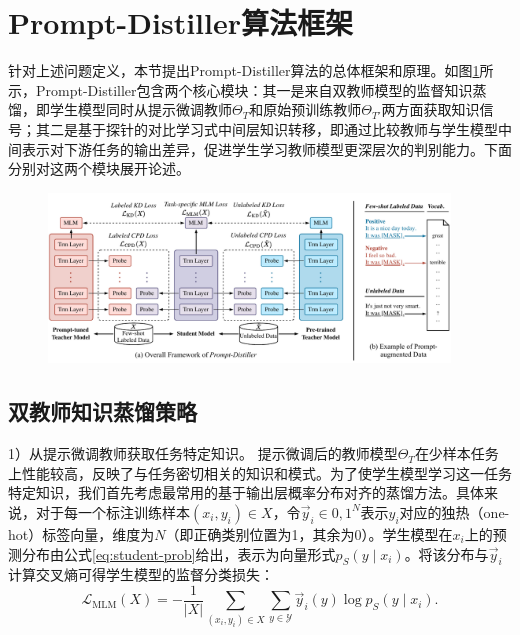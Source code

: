 \documentclass[../main.tex]{subfiles}
\begin{document}
\section{Prompt-Distiller算法框架}
\label{sec:3-3}
针对上述问题定义，本节提出Prompt-Distiller算法的总体框架和原理。如图\ref{fig:PromptDistillerFramework}所示，Prompt-Distiller包含两个核心模块：其一是来自双教师模型的监督知识蒸馏，即学生模型同时从提示微调教师$\Theta_T$和原始预训练教师$\Theta_{T'}$两方面获取知识信号；其二是基于探针的对比学习式中间层知识转移，即通过比较教师与学生模型中间表示对下游任务的输出差异，促进学生学习教师模型更深层次的判别能力。下面分别对这两个模块展开论述。

\begin{figure}[htbp]
	\centering
	\includegraphics[width=0.95\textwidth]{Prompt-Distiller/framework.pdf}
	\label{fig:PromptDistillerFramework}
\end{figure}

\subsection{双教师知识蒸馏策略}
\label{sec:3-3-1}
1）从提示微调教师获取任务特定知识。 提示微调后的教师模型$\Theta_T$在少样本任务上性能较高，反映了与任务密切相关的知识和模式。为了使学生模型学习这一任务特定知识，我们首先考虑最常用的基于输出层概率分布对齐的蒸馏方法。具体来说，对于每一个标注训练样本$(x_i, y_i) \in X$，令$\vec{y}_i \in {0,1}^N$表示$y_i$对应的独热（one-hot）标签向量，维度为$N$（即正确类别位置为1，其余为0）。学生模型在$x_i$上的预测分布由公式\eqref{eq:student-prob}给出，表示为向量形式$p_S(y\mid x_i)$。将该分布与$\vec{y}_i$计算交叉熵可得学生模型的监督分类损失：
\begin{equation}
	\label{eq:mlm-loss}
	\mathcal{L}_{\text{MLM}}(X) = -\frac{1}{|X|} \sum_{(x_i, y_i)\in X} \sum_{y \in \mathcal{Y}} \vec{y}_i(y)\log p_S(y \mid x_i) .
\end{equation}
\end{document}
